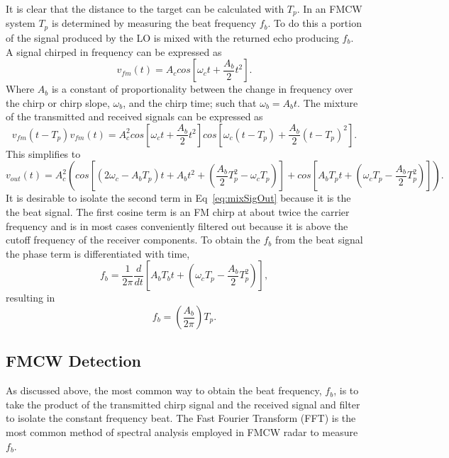 It is clear that the distance to the target can be calculated with $T_p$. In an FMCW system
$T_p$ is determined by measuring the beat frequency $f_b$. To do this a portion of the signal
produced by the LO is mixed with the returned echo producing $f_b$. A signal chirped in frequency
can be expressed as
\begin{equation}
\label{eq:chirpSig}
v_{fm}(t)=A_c cos[\omega_ct+\frac{A_b}{2} t^2].
\end{equation}
Where $A_b$ is a constant of proportionality between the change in frequency over the chirp or chirp slope, $\omega_b$,
and the chirp time; such that $\omega_b=A_bt$. The mixture of the transmitted and received signals can be 
expressed as
\begin{equation}
\label{eq:mixSig}
v_{fm}(t-T_p)v_{fm}(t)=A_c^2 cos[\omega_c t +\frac{A_b}{2}t^2]cos[\omega_c(t-T_p)+\frac{A_b}{2} (t-T_p)^2].
\end{equation}
This simplifies to 
\begin{equation}
\label{eq:mixSigOut}
v_{out}(t)=A_c^2 (cos[(2\omega_c-A_bT_p)t+A_bt^2+(\frac{A_b}{2}T_p^2-\omega_cT_p)]+cos[A_bT_pt+(\omega_cT_p-\frac{A_b}{2}T_p^2)]).
\end{equation}
It is desirable to isolate the second term in Eq~\ref{eq:mixSigOut} because it is the the beat signal. 
The first cosine term is an FM chirp at about twice the carrier frequency and is in most cases 
conveniently filtered out because it is above the cutoff frequency of the receiver components.
To obtain the $f_b$ from the beat signal the phase term is differentiated with time, 
\begin{equation}
\label{eq:phaseDiff}
f_b=\frac{1}{2\pi}\frac{d}{dt}[A_bT_bt+(\omega_cT_p-\frac{A_b}{2}T_p^2)],
\end{equation}
resulting in
\begin{equation}
\label{eq:fb}
f_b=(\frac{A_b}{2\pi})T_p.
\end{equation}

\subsection{FMCW Detection}
As discussed above, the most common way to obtain the beat frequency, $f_b$, is to 
take the product of the transmitted chirp signal and the received signal and filter 
to isolate the constant frequency beat. The Fast Fourier Transform (FFT) is the most
common method of spectral analysis employed in FMCW radar to measure $f_b$. 

